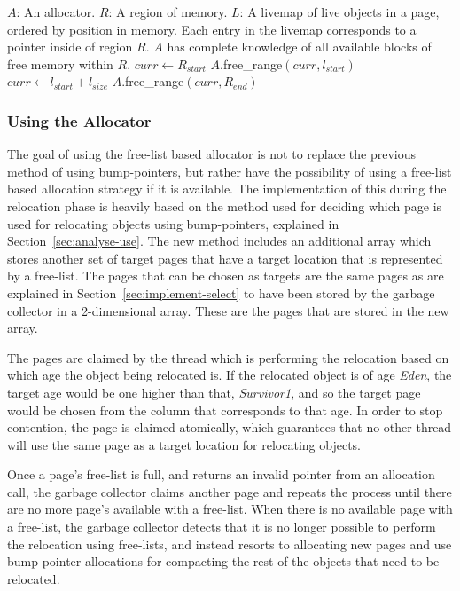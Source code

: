 \begin{algorithm}[H]{}
    \caption{$(A,R,L)$}
    \label{alg:init}
    \begin{algorithmic}[1]
        \Require 
        \Statex $A$: An allocator.
        \Statex $R$: A region of memory.
        \Statex $L$: A livemap of live objects in a page, ordered by position in memory. Each entry in the livemap corresponds to a pointer inside of region $R$. 
        \Ensure 
        \Statex $A$ has complete knowledge of all available blocks of free memory within $R$.
        \State $curr\gets R_{start}$ 
          
        \State $A$.free\_range$(curr, l_{start})$ 
        \EndIf
        \State $curr\gets l_{start} + l_{size}$ 
        \EndFor
        \State $A$.free\_range$(curr,R_{end})$ 
    \end{algorithmic}
\end{algorithm}

\subsubsection{Using the Allocator}
\label{sec:implement-use}
The goal of using the free-list based allocator is not to replace the previous method of using bump-pointers, but rather have the possibility of using a free-list based allocation strategy if it is available. The implementation of this during the relocation phase is heavily based on the method used for deciding which page is used for relocating objects using bump-pointers, explained in Section~\ref{sec:analyse-use}. The new method includes an additional array which stores another set of target pages that have a target location that is represented by a free-list. The pages that can be chosen as targets are the same pages as are explained in Section~\ref{sec:implement-select} to have been stored by the garbage collector in a 2-dimensional array. These are the pages that are stored in the new array.

The pages are claimed by the thread which is performing the relocation based on which age the object being relocated is. If the relocated object is of age \textit{Eden}, the target age would be one higher than that, \textit{Survivor1}, and so the target page would be chosen from the column that corresponds to that age. In order to stop contention, the page is claimed atomically, which guarantees that no other thread will use the same page as a target location for relocating objects.

Once a page's free-list is full, and returns an invalid pointer from an allocation call, the garbage collector claims another page and repeats the process until there are no more page's available with a free-list. When there is no available page with a free-list, the garbage collector detects that it is no longer possible to perform the relocation using free-lists, and instead resorts to allocating new pages and use bump-pointer allocations for compacting the rest of the objects that need to be relocated. 